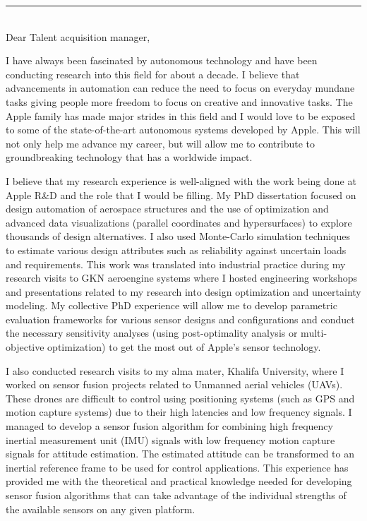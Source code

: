 \documentclass[12pt]{article} %
\begin{document}
\begin{paracol}{2}
\end{paracol}

\medskip %
\rule[0pt]{\textwidth}{1pt}\\

Dear Talent acquisition manager,

\medskip %
I have always been fascinated by autonomous technology and have been conducting research into this field for about a decade. I believe that advancements in automation can reduce the need to focus on everyday mundane tasks giving people more freedom to focus on creative and innovative tasks. The Apple family has made major strides in this field and I would love to be exposed to some of the state-of-the-art autonomous systems developed by Apple. This will not only help me advance my career, but will allow me to contribute to groundbreaking technology that has a worldwide impact. 

\medskip %

I believe that my research experience is well-aligned with the work being done at Apple R\&D and the role that I would be filling. My PhD dissertation focused on design automation of aerospace structures and the use of optimization and advanced data visualizations (parallel coordinates and hypersurfaces) to explore thousands of design alternatives. I also used Monte-Carlo simulation techniques to estimate various design attributes such as reliability against uncertain loads and requirements. This work was translated into industrial practice during my research visits to GKN aeroengine systems where I hosted engineering workshops and presentations related to my research into design optimization and uncertainty modeling. My collective PhD experience will allow me to develop parametric evaluation frameworks for various sensor designs and configurations and conduct the necessary sensitivity analyses (using post-optimality analysis or multi-objective optimization) to get the most out of Apple's sensor technology.

\medskip %

I also conducted research visits to my alma mater, Khalifa University, where I worked on sensor fusion projects related to Unmanned aerial vehicles (UAVs). These drones are difficult to control using positioning systems (such as GPS and motion capture systems) due to their high latencies and low frequency signals. I managed to develop a sensor fusion algorithm for combining high frequency inertial measurement unit (IMU) signals with low frequency motion capture signals for attitude estimation. The estimated attitude can be transformed to an inertial reference frame to be used for control applications. This experience has provided me with the theoretical and practical knowledge needed for developing sensor fusion algorithms that can take advantage of the individual strengths of the available sensors on any given platform.
\end{document}
